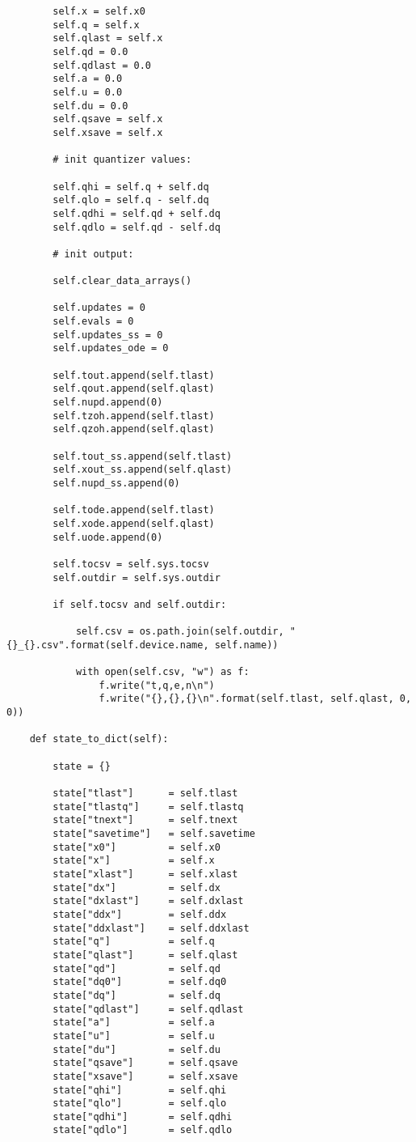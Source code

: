 \begin{lstlisting}
        self.x = self.x0
        self.q = self.x
        self.qlast = self.x
        self.qd = 0.0
        self.qdlast = 0.0
        self.a = 0.0
        self.u = 0.0
        self.du = 0.0
        self.qsave = self.x
        self.xsave = self.x

        # init quantizer values:

        self.qhi = self.q + self.dq
        self.qlo = self.q - self.dq
        self.qdhi = self.qd + self.dq
        self.qdlo = self.qd - self.dq

        # init output:

        self.clear_data_arrays()

        self.updates = 0
        self.evals = 0
        self.updates_ss = 0
        self.updates_ode = 0

        self.tout.append(self.tlast)
        self.qout.append(self.qlast)
        self.nupd.append(0)
        self.tzoh.append(self.tlast)
        self.qzoh.append(self.qlast)

        self.tout_ss.append(self.tlast)
        self.xout_ss.append(self.qlast)
        self.nupd_ss.append(0)

        self.tode.append(self.tlast)
        self.xode.append(self.qlast)
        self.uode.append(0)

        self.tocsv = self.sys.tocsv
        self.outdir = self.sys.outdir

        if self.tocsv and self.outdir:

            self.csv = os.path.join(self.outdir, "{}_{}.csv".format(self.device.name, self.name))

            with open(self.csv, "w") as f:
                f.write("t,q,e,n\n")
                f.write("{},{},{}\n".format(self.tlast, self.qlast, 0, 0))

    def state_to_dict(self):

        state = {}

        state["tlast"]      = self.tlast
        state["tlastq"]     = self.tlastq
        state["tnext"]      = self.tnext
        state["savetime"]   = self.savetime
        state["x0"]         = self.x0
        state["x"]          = self.x
        state["xlast"]      = self.xlast
        state["dx"]         = self.dx
        state["dxlast"]     = self.dxlast
        state["ddx"]        = self.ddx
        state["ddxlast"]    = self.ddxlast
        state["q"]          = self.q
        state["qlast"]      = self.qlast
        state["qd"]         = self.qd
        state["dq0"]        = self.dq0
        state["dq"]         = self.dq
        state["qdlast"]     = self.qdlast
        state["a"]          = self.a
        state["u"]          = self.u
        state["du"]         = self.du
        state["qsave"]      = self.qsave
        state["xsave"]      = self.xsave
        state["qhi"]        = self.qhi
        state["qlo"]        = self.qlo
        state["qdhi"]       = self.qdhi
        state["qdlo"]       = self.qdlo


\end{lstlisting}
